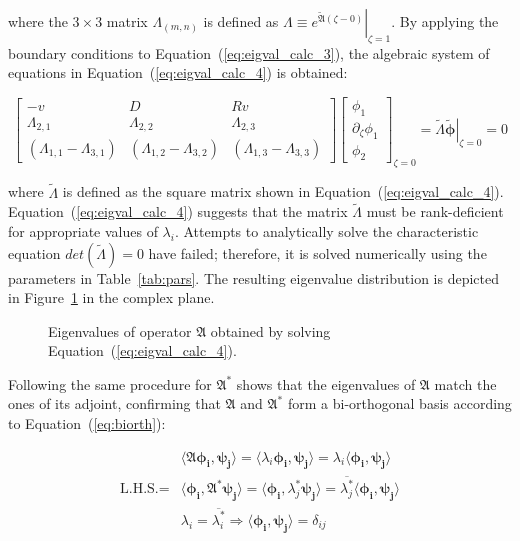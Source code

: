 where the $ 3 \times 3$ matrix $\Lambda_{(m,n)}$ is defined as $\Lambda \equiv \left. e^{\tilde{\mathfrak{A}} (\zeta - 0)} \right|_{\zeta = 1}$. By applying the boundary conditions to Equation~(\ref{eq:eigval_calc_3}), the algebraic system of equations in Equation~(\ref{eq:eigval_calc_4}) is obtained:

\begin{equation} \label{eq:eigval_calc_4}
    \begin{bmatrix}
        -v & D & Rv \\
        \Lambda_{2,1} & \Lambda_{2,2} & \Lambda_{2,3} \\
        (\Lambda_{1,1} - \Lambda_{3,1}) & (\Lambda_{1,2} - \Lambda_{3,2}) & (\Lambda_{1,3} - \Lambda_{3,3})
    \end{bmatrix} \begin{bmatrix}
        \phi_1 \\ \partial_\zeta \phi_1 \\ \phi_2
    \end{bmatrix}_{\zeta=0} = \tilde{\Lambda} \left. \tilde{\bm{\phi}} \right|_{\zeta = 0} = 0
\end{equation}

where $\tilde{\Lambda}$ is defined as the square matrix shown in Equation~(\ref{eq:eigval_calc_4}). Equation~(\ref{eq:eigval_calc_4}) suggests that the matrix $\tilde{\Lambda}$ must be rank-deficient for appropriate values of $\lambda_i$. Attempts to analytically solve the characteristic equation $det(\tilde{\Lambda}) = 0$ have failed; therefore, it is solved numerically using the parameters in Table~\ref{tab:pars}. The resulting eigenvalue distribution is depicted in Figure~\ref{fig:eigval_dist} in the complex plane. 

\begin{figure}[!htbp]
    \centering
    
    \caption{Eigenvalues of operator $\mathfrak{A}$ obtained by solving Equation~(\ref{eq:eigval_calc_4}).}
    \label{fig:eigval_dist}
\end{figure}

Following the same procedure for $\mathfrak{A}^*$ shows that the eigenvalues of $\mathfrak{A}$ match the ones of its adjoint, confirming that $\mathfrak{A}$ and $\mathfrak{A}^*$ form a bi-orthogonal basis according to Equation~(\ref{eq:biorth}):

\begin{equation} \label{eq:biorth}
    \begin{aligned}
        &\langle \mathfrak{A} \bm{\phi_i}, \bm{\psi_j} \rangle = \langle \lambda_i \bm{\phi_i}, \bm{\psi_j} \rangle = \lambda_i \langle \bm{\phi_i}, \bm{\psi_j} \rangle \\
        \text{L.H.S.} = &\langle \bm{\phi_i}, \mathfrak{A}^* \bm{\psi_j} \rangle = \langle \bm{\phi_i}, \lambda_j^* \bm{\psi_j} \rangle = \overline{\lambda_j^*} \langle \bm{\phi_i}, \bm{\psi_j} \rangle \\
        &\lambda_i = \overline{\lambda_i^*} \Rightarrow \langle \bm{\phi_i}, \bm{\psi_j} \rangle = \delta_{ij}
    \end{aligned}
\end{equation}

